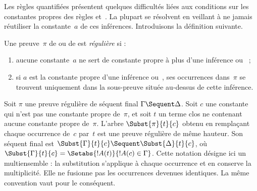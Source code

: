\documentclass[../../../include/open-logic-section]{subfiles}
\begin{document}


Les règles quantifiées présentent quelques difficultés
liées aux conditions sur les constantes propres des
règles \LeftR{\lexists} et~\RightR{\lforall}.
La plupart se résolvent en veillant à ne jamais
réutiliser la constante~$a$ de ces inférences.
Introduisons la définition suivante.

\begin{defn}
Une preuve~$\pi$ de  ou de 
est \emph{régulière} si :
\begin{enumerate}
  \item aucune constante~$a$ ne sert de constante propre
  à plus d'une inférence \LeftR{\lexists}
  ou~\RightR{\lforall} ;
  \item si $a$ est la constante propre d'une inférence
  \LeftR{\lexists} ou~\RightR{\lforall},
  ses occurrences dans~$\pi$ se trouvent uniquement
  dans la sous-preuve située au-dessus de cette inférence.
\end{enumerate}
\end{defn}

\begin{lem}
Soit $\pi$ une preuve régulière de séquent final
$\Gamma \Sequent \Delta$.
Soit $c$ une constante qui n'est pas une constante
propre de~$\pi$, et soit $t$ un terme clos ne contenant
aucune constante propre de~$\pi$.
L'arbre $\Subst{\pi}{t}{c}$ obtenu en remplaçant
chaque occurrence de~$c$ par~$t$ est une preuve régulière de même hauteur.
Son séquent final est
$\Subst{\Gamma}{t}{c} \Sequent \Subst{\Delta}{t}{c}$,
où
$\Subst{\Gamma}{t}{c} = \Setabs{!A(t)}{!A(c) \in \Gamma}$.
Cette notation désigne ici un multiensemble :
la substitution s'applique à chaque occurrence
et en conserve la multiplicité. Elle ne fusionne
pas les occurrences devenues identiques.
La même convention vaut pour le conséquent.
\end{lem}
\end{document}
